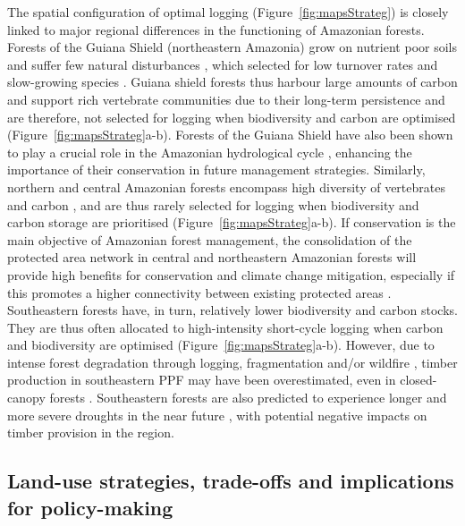 \documentclass[12pt]{article}
\begin{document}
The spatial configuration of optimal logging (Figure~\ref{fig:mapsStrateg}) is closely linked to major regional differences in the functioning of Amazonian forests. Forests of the Guiana Shield (northeastern Amazonia) grow on nutrient poor soils and suffer few natural disturbances \cite{Espirito-Santo2014}, which selected for low turnover rates and slow-growing species \cite{Grau2017}. Guiana shield forests thus harbour large amounts of carbon \cite{Avitabile2016} and support rich vertebrate communities \cite{Denis2018} due to their long-term persistence \cite{Barthe2017} and are therefore, not selected for logging when biodiversity and carbon are optimised (Figure~\ref{fig:mapsStrateg}a-b). Forests of the Guiana Shield have also been shown to play a crucial role in the Amazonian hydrological cycle \cite{Bovolo2018,Staal2018}, enhancing the importance of their conservation in future management strategies. Similarly, northern and central Amazonian forests encompass high diversity of vertebrates \cite{Jenkins2013} and carbon \cite{Avitabile2016}, and are thus rarely selected for logging when biodiversity and carbon storage are prioritised (Figure~\ref{fig:mapsStrateg}a-b). If conservation is the main objective of Amazonian forest management, the consolidation of the protected area network in central and northeastern Amazonian forests will provide high benefits for conservation and climate change mitigation, especially if this promotes a higher connectivity between existing protected areas \cite{Hansen2007}. Southeastern forests have, in turn, relatively lower biodiversity and carbon stocks. They are thus often allocated to high-intensity short-cycle logging when carbon and biodiversity are optimised (Figure~\ref{fig:mapsStrateg}a-b). However, due to intense forest degradation through logging, fragmentation and/or wildfire \cite{Davidson2012,Foley2007}, timber production in southeastern PPF may have been overestimated, even in closed-canopy forests \cite{Asner2004}. Southeastern forests are also predicted to experience longer and more severe droughts in the near future \cite{Duffy2015}, with potential negative impacts on timber provision in the region.  
 
\subsection*{Land-use strategies, trade-offs and implications for policy-making}
\end{document}
